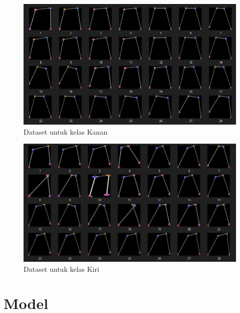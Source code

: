 \begin{figure}[H]
  \centering
  \includegraphics[scale=0.5]{gambar/folder dataset kanan.png}
  \caption{Dataset untuk kelas Kanan}
  \label{fig:DatasetKanan}
\end{figure}

\begin{figure}[H]
  \centering
  \includegraphics[scale=0.5]{gambar/folder dataset kiri.png}
  \caption{Dataset untuk kelas Kiri}
  \label{fig:DatasetKiri}
\end{figure}


\section{Model}
\label{sec:Klasifikasi}

